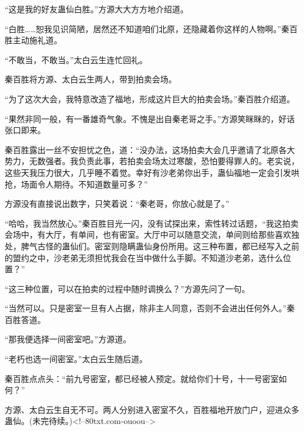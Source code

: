 \begin{this_body}
“这是我的好友蛊仙白胜。”方源大大方方地介绍道。

“白胜……恕我见识简陋，居然还不知道咱们北原，还隐藏着你这样的人物啊。”秦百胜主动施礼道。

“不敢当，不敢当。”太白云生连忙回礼。

秦百胜将方源、太白云生两人，带到拍卖会场。

“为了这次大会，我特意改造了福地，形成这片巨大的拍卖会场。”秦百胜介绍道。

“果然非同一般，有一番雄奇气象。不愧是出自秦老哥之手。”方源笑眯眯的，好话张口即来。

秦百胜露出一丝不安担忧之色，道：“没办法，这场拍卖大会几乎邀请了北原各大势力，无数强者。我负责此事，若拍卖会场太过寒酸，恐怕要得罪人的。老实说，这些天我压力很大，几乎睡不着觉。幸好有沙老弟你出手，蛊仙福地一定会引发哄抢，场面令人期待。不知道数量可多？”

方源没有直接说出数字，只笑着说：“秦老哥，你放心就是了。”

“哈哈，我当然放心。”秦百胜目光一闪，没有试探出来，索性转过话题，“我这拍卖会场中，有大厅，有单间，也有密室。大厅中可以随意交流，单间则给那些喜欢独处，脾气古怪的蛊仙们。密室则隐瞒蛊仙身份所用。这三种布置，都已经写入之前的盟约之中，沙老弟无须担忧我会在当中做什么手脚。不知道沙老弟，选什么位置？”

“这三种位置，可以在拍卖的过程中随时调换么？”方源先问了一句。

“当然可以。只是密室一旦有人占据，除非主人同意，否则不会进出任何外人。”秦百胜答道。

“那我便选择一间密室吧。”方源道。

“老朽也选一间密室。”太白云生随后道。

秦百胜点点头：“前九号密室，都已经被人预定。就给你们十号，十一号密室如何？”

方源、太白云生自无不可。两人分别进入密室不久，百胜福地开放门户，迎进众多蛊仙。(未完待续。)<!--80txt.com-ouoou-->

\end{this_body}

